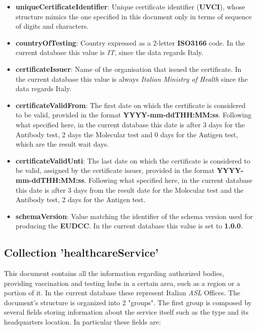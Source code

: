 \documentclass{article}[IEEEtran]
\begin{document}
\begin{itemize}
        \item \textbf{uniqueCertificateIdentifier}: Unique certificate identifier (\textbf{UVCI}), whose structure mimics the one specified in this document only in terms of sequence of digits and characters.
        
        \item \textbf{countryOfTesting}: Country expressed as a 2-letter \textbf{ISO3166} code. In the current database this value is \textit{IT}, since the data regards Italy.
        
        \item \textbf{certificateIssuer}: Name of the organisation that issued the certificate. In the current database this value is always \textit{Italian Ministry of Health} since the data regards Italy.
        
        \item \textbf{certificateValidFrom}: The first date on which the certificate is considered to be valid, provided in the format \textbf{YYYY-mm-ddTHH:MM:ss}. Following what specified here, in the current database this date is after 3 days for the Antibody test, 2 days the Molecular test and 0 days for the Antigen test, which are the result wait days.
        
        \item \textbf{certificateValidUnti}: The last date on which the certificate is considered to be valid, assigned by the certificate issuer, provided in the format \textbf{YYYY-mm-ddTHH:MM:ss}. Following what specified here, in the current database this date is after 3 days from the result date for the Molecular test and the Antibody test, 2 days for the Antigen test.
        
        \item \textbf{schemaVersion}: Value matching the identifier of the schema version used for producing the \textbf{EUDCC}. In the current database this value is set to \textbf{1.0.0}.
        
    \end{itemize}


\subsection{Collection 'healthcareService'}
This document contains all the information regarding authorized bodies, providing vaccination and testing hubs in a certain area, such as a region or a portion of it. In the current database these represent Italian \textit{ASL} Offices. The document's structure is organized into 2 "groups".
The first group is composed by several fields storing information about the service itself such as the type and its headquarters location. 
In particular these fields are:
\end{document}
